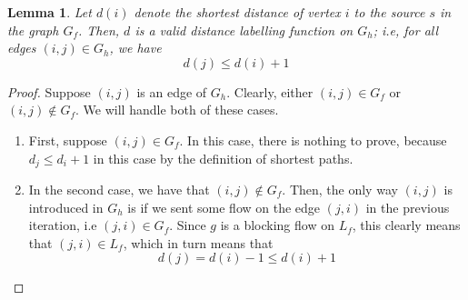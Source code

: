 \documentclass[12pt,a4paper]{amsart}
\numberwithin{equation}{section}
\newtheorem{Lemma}[Th]{Lemma}
\theoremstyle{definition}
\begin{document}
\begin{Lemma}
	\label{validDistanceLabel}
	Let $d(i)$ denote the shortest distance of vertex $i$ to the source $s$ in the graph $G_f$. Then, $d$ is a valid distance labelling function on $G_h$; i.e, for all edges $(i, j)\in G_h$, we have
	$$d(j)\le d(i) + 1$$
\end{Lemma}
\begin{proof}
	Suppose $(i, j)$ is an edge of $G_h$. Clearly, either $(i, j)\in G_f$ or $(i, j)\notin G_f$. We will handle both of these cases. 
	\begin{enumerate}
		\item First, suppose $(i, j)\in G_f$. In this case, there is nothing to prove, because $d_j \le d_i + 1$ in this case by the definition of shortest paths. 
		\item In the second case, we have that $(i, j)\notin G_f$. Then, the only way $(i, j)$ is introduced in $G_h$ is if we sent some flow on the edge $(j, i)$ in the previous iteration, i.e $(j, i)\in G_f$. Since $g$ is a blocking flow on $L_f$, this clearly means that $(j, i)\in L_f$, which in turn means that 
		$$d(j) = d(i) - 1 \le d(i) + 1$$
	\end{enumerate}
\end{proof}
\end{document}
